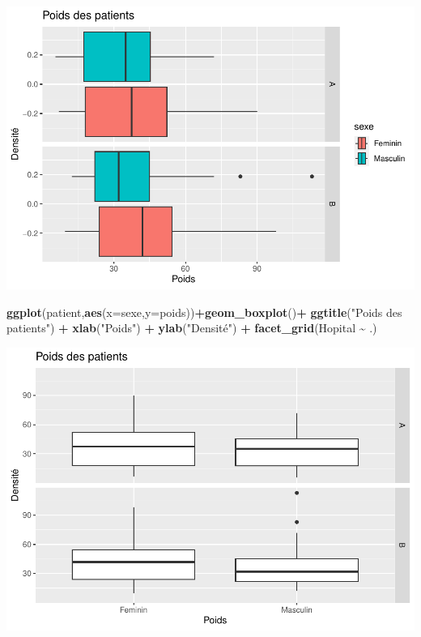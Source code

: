 \documentclass[
]{book}
\newenvironment{Shaded}{\begin{snugshade}}{\end{snugshade}}
\newcommand{\AttributeTok}[1]{\textcolor[rgb]{0.13,0.29,0.53}{#1}}
\newcommand{\FunctionTok}[1]{\textcolor[rgb]{0.13,0.29,0.53}{\textbf{#1}}}
\newcommand{\NormalTok}[1]{#1}
\newcommand{\SpecialCharTok}[1]{\textcolor[rgb]{0.81,0.36,0.00}{\textbf{#1}}}
\newcommand{\StringTok}[1]{\textcolor[rgb]{0.31,0.60,0.02}{#1}}
\begin{document}
\includegraphics{_main_files/figure-latex/ggplot12-1.pdf}

\begin{Shaded}
\begin{Highlighting}[]
\FunctionTok{ggplot}\NormalTok{(patient,}\FunctionTok{aes}\NormalTok{(}\AttributeTok{x=}\NormalTok{sexe,}\AttributeTok{y=}\NormalTok{poids))}\SpecialCharTok{+}\FunctionTok{geom\_boxplot}\NormalTok{()}\SpecialCharTok{+}
  \FunctionTok{ggtitle}\NormalTok{(}\StringTok{"Poids des patients"}\NormalTok{) }\SpecialCharTok{+} 
  \FunctionTok{xlab}\NormalTok{(}\StringTok{"Poids"}\NormalTok{) }\SpecialCharTok{+} 
  \FunctionTok{ylab}\NormalTok{(}\StringTok{"Densité"}\NormalTok{) }\SpecialCharTok{+}
  \FunctionTok{facet\_grid}\NormalTok{(Hopital }\SpecialCharTok{\textasciitilde{}}\NormalTok{ .)}
\end{Highlighting}
\end{Shaded}

\includegraphics{_main_files/figure-latex/ggplot13-1.pdf}
\end{document}
